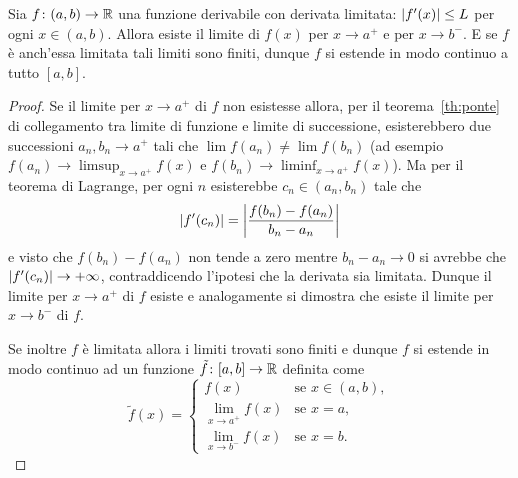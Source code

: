 \begin{exercise}
  \label{ex:estensione_continua_derivata_limitata}
Sia $f\colon (a,b)\to {\mathbb R}$ una funzione derivabile con derivata 
limitata: ${\left|f'(x)\right|} \le L$ per ogni $x\in (a,b)$.
Allora esiste il limite di $f(x)$ per $x\to a^+$ e per $x\to b^-$.
E se $f$ è anch'essa limitata tali limiti sono finiti, dunque 
$f$ si estende in modo continuo a tutto $[a,b]$.
\end{exercise}
\begin{proof}
Se il limite per $x\to a^+$ di $f$ non esistesse allora,
per il teorema~\ref{th:ponte} di collegamento tra limite di funzione 
e limite di successione, esisterebbero due successioni $a_n, b_n \to a^+$
tali che $\lim f(a_n) \neq \lim f(b_n)$
(ad esempio $f(a_n)\to \limsup_{x\to a^+} f(x)$ e
$f(b_n)\to \liminf_{x\to a^+} f(x)$).
Ma per il teorema di Lagrange, per ogni $n$ esisterebbe $c_n \in (a_n, b_n)$ tale che
\[
  {\left|f'(c_n)\right|} =
  {\left|\frac{f(b_n) - f(a_n)}{b_n - a_n}\right|}
\]
e visto che $f(b_n)-f(a_n)$ non tende a zero mentre $b_n - a_n \to 0$
si avrebbe che ${\left|f'(c_n)\right|} \to +\infty$,
contraddicendo l'ipotesi che la derivata sia limitata.
Dunque il limite per $x\to a^+$ di $f$ esiste e analogamente si dimostra che esiste
il limite per $x\to b^-$ di $f$.

Se inoltre $f$ è limitata
allora i limiti trovati sono finiti e 
dunque $f$ si estende in modo continuo ad un funzione $\tilde f\colon [a,b]\to {\mathbb R}$ 
definita come
\[
  \tilde f(x) = \begin{cases}
    f(x) & \text{se }x\in (a,b),\\
    \displaystyle\lim_{x\to a^+} f(x) & \text{se } x=a,\\
    \displaystyle\lim_{x\to b^-} f(x) & \text{se } x=b.
  \end{cases}
\]
\end{proof}
